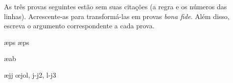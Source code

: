\problempart
As três provas seguintes estão sem suas citações (a regra e os números das linhas). Acrescente-as para transformá-las em provas \textit{bona fide}. Além disso, escreva o argumento correspondente a cada prova.

\begin{fitchproof}
\ae{ps}
\ae{ps}
\end{fitchproof}

\medskip

\begin{fitchproof}
\open
	\ae{ab}
\close
{}
\end{fitchproof}

\noindent{}

\medskip

\begin{fitchproof}
\open
	\ae{jj}
\close
\open
\close
{}\oe{jol, j-j2, l-j3}
\end{fitchproof}

\noindent{}

\

